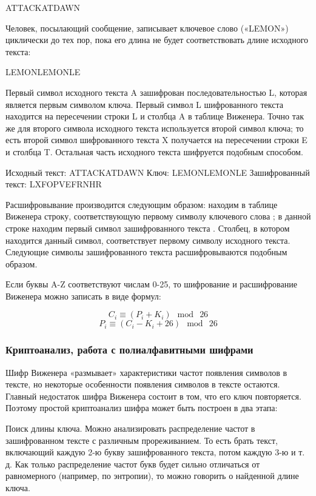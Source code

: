 ATTACKATDAWN

Человек, посылающий сообщение, записывает ключевое слово («LEMON») 
циклически до тех пор, пока его длина не будет соответствовать 
длине исходного текста:

LEMONLEMONLE

Первый символ исходного текста A зашифрован последовательностью 
L, которая является первым символом ключа. Первый символ L шифрованного 
текста находится на пересечении строки L и столбца A в таблице 
Виженера. Точно так же для второго символа исходного текста используется 
второй символ ключа; то есть второй символ шифрованного текста 
X получается на пересечении строки E и столбца T. Остальная часть 
исходного текста шифруется подобным способом.

Исходный текст:      ATTACKATDAWN
Ключ:                LEMONLEMONLE
Зашифрованный текст: LXFOPVEFRNHR

Расшифровывание производится следующим образом: находим в таблице 
Виженера строку, соответствующую первому символу ключевого слова
; в данной строке находим первый символ зашифрованного текста
. Столбец, в котором находится данный символ, соответствует первому 
символу исходного текста. Следующие символы зашифрованного текста 
расшифровываются подобным образом.

Если буквы A-Z соответствуют числам 0-25, то шифрование и расшифрование Виженера 
можно записать в виде формул:

    $$C_i \equiv (P_i + K_i) \mod\ 26$$
    $$P_i \equiv (C_i - K_i + 26) \mod\ 26$$

\subsubsection{Криптоанализ, работа с полиалфавитными шифрами}

Шифр Виженера «размывает» характеристики частот появления символов 
в тексте, но некоторые особенности появления символов в тексте 
остаются. Главный недостаток шифра Виженера состоит в том, что 
его ключ повторяется. Поэтому простой криптоанализ шифра может 
быть построен в два этапа:

Поиск длины ключа. Можно анализировать распределение частот в 
зашифрованном тексте с различным прореживанием. То есть брать 
текст, включающий каждую 2-ю букву зашифрованного текста, потом 
каждую 3-ю и т. д. Как только распределение частот букв будет 
сильно отличаться от равномерного (например, по энтропии), то 
можно говорить о найденной длине ключа.

